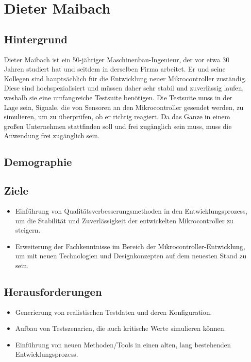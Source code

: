 \section{Dieter Maibach}
\subsection*{Hintergrund}
Dieter Maibach ist ein 50-jähriger Maschinenbau-Ingenieur, der vor etwa 30 Jahren studiert hat und seitdem in derselben Firma arbeitet. 
Er und seine Kollegen sind hauptsächlich für die Entwicklung neuer Mikrocontroller zuständig. Diese sind hochspezialisiert und müssen daher sehr stabil und zuverlässig laufen, 
weshalb sie eine umfangreiche Testsuite benötigen. Die Testsuite muss in der Lage sein, Signale, die von Sensoren an den Mikrocontroller gesendet werden, zu simulieren, 
um zu überprüfen, ob er richtig reagiert. Da das Ganze in einem großen Unternehmen stattfinden soll und frei zugänglich sein muss, muss die Anwendung frei zugänglich sein.

\subsection*{Demographie}

\subsection*{Ziele}
\begin{itemize}
    \item Einführung von Qualitätsverbesserungsmethoden in den Entwicklungsprozess, um die Stabilität und Zuverlässigkeit der entwickelten Mikrocontroller zu steigern.
    \item Erweiterung der Fachkenntnisse im Bereich der Mikrocontroller-Entwicklung, um mit neuen Technologien und Designkonzepten auf dem neuesten Stand zu sein.
\end{itemize}

\subsection*{Herausforderungen}
\begin{itemize}
    \item Generierung von realistischen Testdaten und deren Konfiguration.
    \item Aufbau von Testszenarien, die auch kritische Werte simulieren können.
    \item Einführung von neuen Methoden/Tools in einen alten, lang bestehenden Entwicklungsprozess.
\end{itemize}

